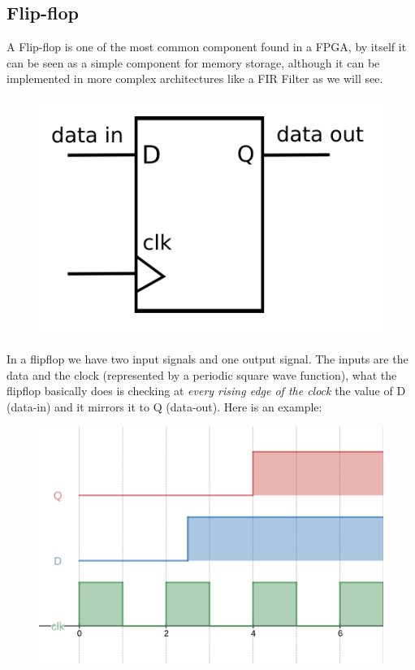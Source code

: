 \documentclass[11pt,a4paper,twocolumn]{IEEEtran}
\begin{document}
		\subsection*{Flip-flop}
		A Flip-flop is one of the most common component found in a FPGA, by itself it can be seen as a simple component for memory storage, although it can be implemented in more complex architectures like a FIR Filter as we will see.\newpage
		\begin{figure}[h]
			\centering
			\includegraphics[width=0.6\linewidth]{img/ff}
		\end{figure}
		In a flipflop we have two input signals and one output signal. The inputs are the data and the clock (represented by a periodic square wave function), what the flipflop basically does is checking at \emph{every rising edge of the clock} the value of D (data-in) and it mirrors it to Q (data-out). Here is an example:\\
	\begin{figure}[h]
		\centering
		\includegraphics[width=1\linewidth]{img/ffsignals}
	\end{figure}
\end{document}
